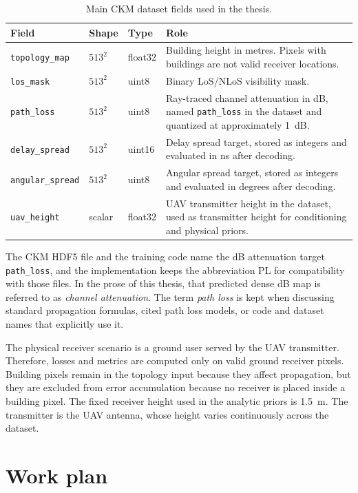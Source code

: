 \begin{table}[ht]
\centering
\caption{Main CKM dataset fields used in the thesis.}
\label{tab:dataset_fields_intro}
\begin{tabularx}{\textwidth}{lllX}
\toprule
Field & Shape & Type & Role \\
\midrule
\texttt{topology\_map} & $513^2$ & float32 & Building height in metres. Pixels with buildings are not valid receiver locations. \\
\texttt{los\_mask} & $513^2$ & uint8 & Binary LoS/NLoS visibility mask. \\
\texttt{path\_loss} & $513^2$ & uint8 & Ray-traced channel attenuation in dB, named \texttt{path\_loss} in the dataset and quantized at approximately \SI{1}{dB}. \\
\texttt{delay\_spread} & $513^2$ & uint16 & Delay spread target, stored as integers and evaluated in ns after decoding. \\
\texttt{angular\_spread} & $513^2$ & uint8 & Angular spread target, stored as integers and evaluated in degrees after decoding. \\
\texttt{uav\_height} & scalar & float32 & UAV transmitter height in the dataset, used as transmitter height for conditioning and physical priors. \\
\bottomrule
\end{tabularx}
\end{table}

The CKM HDF5 file and the training code name the dB attenuation target
\texttt{path\_loss}, and the implementation keeps the abbreviation PL for
compatibility with those files. In the prose of this thesis, that predicted
dense dB map is referred to as \emph{channel attenuation}. The term
\emph{path loss} is kept when discussing standard propagation formulas, cited
path loss models, or code and dataset names that explicitly use it.

The physical receiver scenario is a ground user served by the UAV transmitter. Therefore,
losses and metrics are computed only on valid ground receiver pixels. Building
pixels remain in the topology input because they affect propagation, but they
are excluded from error accumulation because no receiver is placed inside a
building pixel. The fixed receiver height used in the analytic priors is
\SI{1.5}{m}. The transmitter is the UAV antenna, whose height varies
continuously across the dataset.

\section{Work plan}
\label{sec:workplan}

